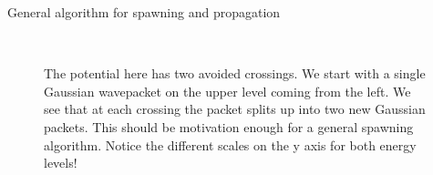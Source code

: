 \begin{chapter}{General algorithm for spawning and propagation}
\begin{figure}[h!]
  \centering
   \\
  \caption[Motivating example for general spawn propagation algorithm]{
  The potential here has two avoided crossings. We start with a single
  Gaussian wavepacket on the upper level coming from the left. We see
  that at each crossing the packet splits up into two new Gaussian packets.
  This should be motivation enough for a general spawning algorithm.
  Notice the different scales on the y axis for both energy levels!
  }
  \label{fig:double_gap}
\end{figure}


\end{chapter}
